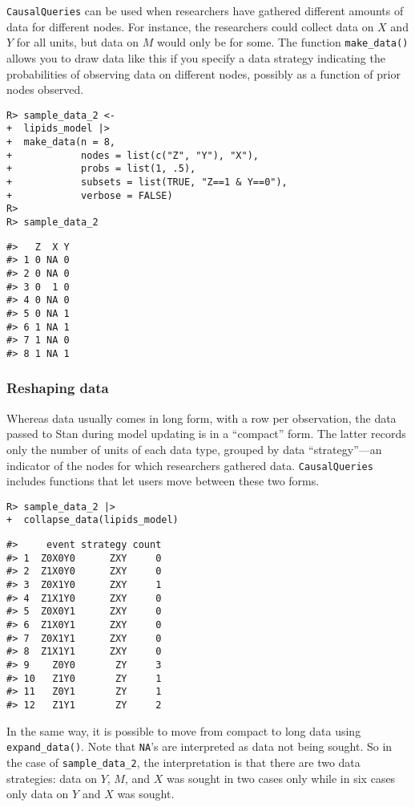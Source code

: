 \documentclass[
  11pt,
  article]{jss}
\begin{document}
\texttt{CausalQueries} can be used when researchers have gathered
different amounts of data for different nodes. For instance, the
researchers could collect data on \(X\) and \(Y\) for all units, but
data on \(M\) would only be for some. The function \texttt{make\_data()}
allows you to draw data like this if you specify a data strategy
indicating the probabilities of observing data on different nodes,
possibly as a function of prior nodes observed.

\begin{verbatim}
R> sample_data_2 <-
+  lipids_model |>
+  make_data(n = 8,
+            nodes = list(c("Z", "Y"), "X"),
+            probs = list(1, .5),
+            subsets = list(TRUE, "Z==1 & Y==0"),
+            verbose = FALSE)
R> 
R> sample_data_2
\end{verbatim}

\begin{verbatim}
#>   Z  X Y
#> 1 0 NA 0
#> 2 0 NA 0
#> 3 0  1 0
#> 4 0 NA 0
#> 5 0 NA 1
#> 6 1 NA 1
#> 7 1 NA 0
#> 8 1 NA 1
\end{verbatim}

\hypertarget{reshaping-data}{%
\subsubsection{Reshaping data}\label{reshaping-data}}

Whereas data usually comes in long form, with a row per observation, the
data passed to Stan during model updating is in a ``compact'' form. The
latter records only the number of units of each data type, grouped by
data ``strategy''---an indicator of the nodes for which researchers
gathered data. \texttt{CausalQueries} includes functions that let users
move between these two forms.

\begin{verbatim}
R> sample_data_2 |> 
+  collapse_data(lipids_model)
\end{verbatim}

\begin{verbatim}
#>     event strategy count
#> 1  Z0X0Y0      ZXY     0
#> 2  Z1X0Y0      ZXY     0
#> 3  Z0X1Y0      ZXY     1
#> 4  Z1X1Y0      ZXY     0
#> 5  Z0X0Y1      ZXY     0
#> 6  Z1X0Y1      ZXY     0
#> 7  Z0X1Y1      ZXY     0
#> 8  Z1X1Y1      ZXY     0
#> 9    Z0Y0       ZY     3
#> 10   Z1Y0       ZY     1
#> 11   Z0Y1       ZY     1
#> 12   Z1Y1       ZY     2
\end{verbatim}

In the same way, it is possible to move from compact to long data using
\texttt{expand\_data()}. Note that \texttt{NA}'s are interpreted as data
not being sought. So in the case of \texttt{sample\_data\_2}, the
interpretation is that there are two data strategies: data on \(Y\),
\(M\), and \(X\) was sought in two cases only while in six cases only
data on \(Y\) and \(X\) was sought.
\end{document}
